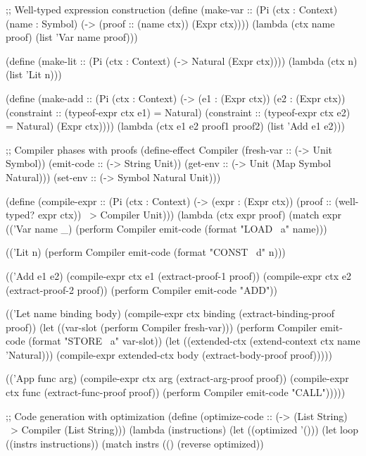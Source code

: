 \begin{example}
\begin{lambdustcode}
;; Well-typed expression construction
(define (make-var :: (Pi (ctx : Context) (name : Symbol)
                         (-> (proof :: (name \in ctx))
                             (Expr ctx))))
  (lambda (ctx name proof)
    (list 'Var name proof)))

(define (make-lit :: (Pi (ctx : Context) (-> Natural (Expr ctx))))
  (lambda (ctx n)
    (list 'Lit n)))

(define (make-add :: (Pi (ctx : Context) 
                         (-> (e1 : (Expr ctx))
                             (e2 : (Expr ctx))
                             (constraint :: (typeof-expr ctx e1) = Natural)
                             (constraint :: (typeof-expr ctx e2) = Natural)
                             (Expr ctx))))
  (lambda (ctx e1 e2 proof1 proof2)
    (list 'Add e1 e2)))

;; Compiler phases with proofs
(define-effect Compiler
  (fresh-var :: (-> Unit Symbol))
  (emit-code :: (-> String Unit))
  (get-env :: (-> Unit (Map Symbol Natural)))
  (set-env :: (-> Symbol Natural Unit)))

(define (compile-expr :: (Pi (ctx : Context)
                            (-> (expr : (Expr ctx))
                                (proof :: (well-typed? expr ctx))
                                ~> {Compiler} Unit)))
  (lambda (ctx expr proof)
    (match expr
      (('Var name _)
       (perform Compiler emit-code (format "LOAD ~a" name)))
      
      (('Lit n)
       (perform Compiler emit-code (format "CONST ~d" n)))
      
      (('Add e1 e2)
       (compile-expr ctx e1 (extract-proof-1 proof))
       (compile-expr ctx e2 (extract-proof-2 proof))
       (perform Compiler emit-code "ADD"))
      
      (('Let name binding body)
       (compile-expr ctx binding (extract-binding-proof proof))
       (let ((var-slot (perform Compiler fresh-var)))
         (perform Compiler emit-code (format "STORE ~a" var-slot))
         (let ((extended-ctx (extend-context ctx name 'Natural)))
           (compile-expr extended-ctx body (extract-body-proof proof)))))
      
      (('App func arg)
       (compile-expr ctx arg (extract-arg-proof proof))
       (compile-expr ctx func (extract-func-proof proof))
       (perform Compiler emit-code "CALL")))))

;; Code generation with optimization
(define (optimize-code :: (-> (List String) ~> {Compiler} (List String)))
  (lambda (instructions)
    (let ((optimized '()))
      (let loop ((instrs instructions))
        (match instrs
          (()
           (reverse optimized))
          

\end{lambdustcode}
\end{example}
